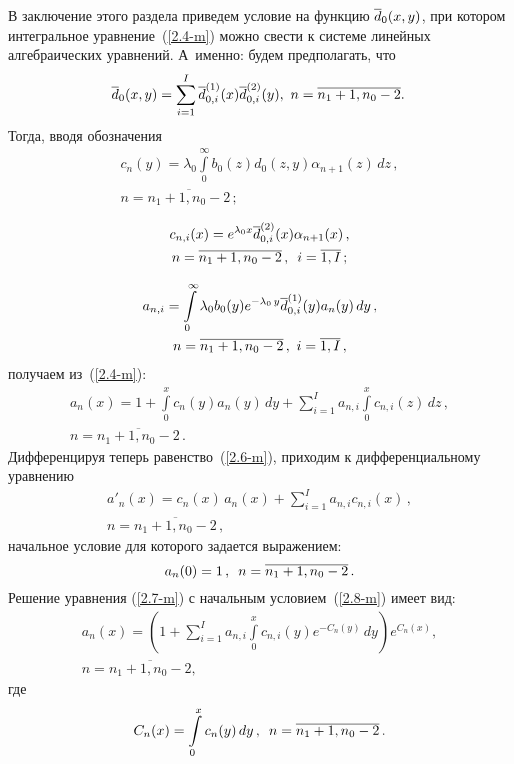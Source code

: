 \begin{multicols}{2}
В заключение этого раздела приведем условие на функцию $\overline d_0(x,y)$, при
котором интегральное уравнение~(\ref{2.4-m}) можно
свести к системе линейных алгебраических уравнений.
А~именно: будем предполагать, что 
\begin{equation}
\label{2.5-1}
\hspace*{-2mm}\d_0(x,y) = \sum\limits_{i=1}^I \d^{(1)}_{0,i}(x) \d^{(2)}_{0,i}(y),
\
 n=\overline{n_1+1,n_0-2}.\!\!
\end{equation}
Тогда, вводя обозначения
\begin{multline*}
c_n(y)= \lambda_0 \int\limits_0^\infty b_0(z) d_0(z,y) \alpha_{n+1}(z)\, dz\,,
\\
 n=\overline{n_1+1,n_0-2}\,;
\end{multline*}

\vspace*{-12pt}

\noindent
\begin{multline*}
c_{n,i}(x) = e^{\lambda_0 x} \overline d^{(2)}_{0,i}(x) \alpha_{n+1}(x)\,,\\
n=\overline{n_1+1,n_0-2}\,,\enskip
i=\overline{1,I}\,;
\end{multline*}

\vspace*{-12pt}

\noindent
\begin{multline*}
a_{n,i} = \int\limits_0^\infty \lambda_0 b_0(y) e^{-\lambda_0\, y} \overline d^{(1)}_{0,i}(y)
a_{n}(y) \, dy\,, \\ n=\overline{n_1+1,n_0-2}\,,
\ i=\overline{1,I}\,,
\end{multline*}
получаем из~(\ref{2.4-m}):
\begin{multline}
a_{n}(x)=1+\int\limits_0^x c_n(y) a_{n}(y)\, dy +
\sum\limits_{i=1}^I a_{n,i} \int\limits_0^x c_{n,i}(z)\, dz\,,
\\ n=\overline{n_1+1,n_0-2}\,.
\label{2.6-m}
\end{multline}
Дифференцируя теперь равенство~(\ref{2.6-m}), приходим
к дифференциальному уравнению
\begin{multline}
a'_{n}(x)= c_n(x)\, a_{n}(x) + \sum\limits_{i=1}^I a_{n,i} c_{n,i}(x)\,,
\\ n=\overline{n_1+1,n_0-2}\,,
\label{2.7-m}
\end{multline}
начальное условие для которого задается выражением:
\begin{equation}
\label{2.8-m}
a_n(0) = 1\,,
\enskip n=\overline{n_1+1,n_0-2}\,.
\end{equation}
Решение уравнения (\ref{2.7-m}) с начальным условием~(\ref{2.8-m}) имеет вид:
\begin{multline}
a_{n}(x) = \left(
1+ \sum\limits_{i=1}^I\! a_{n,i} \int\limits_0^x c_{n,i}(y) e^{- C_n(y)} \,dy
\right)
e^{C_n(x)} ,\\  n=\overline{n_1+1,n_0-2},
\label{2.9-m}
\end{multline}
где
\begin{equation*}
C_{n}(x) = \int\limits_0^x c_n(y)\, dy\,,
\enskip n=\overline{n_1+1,n_0-2}\,.
\end{equation*}


\end{multicols}

